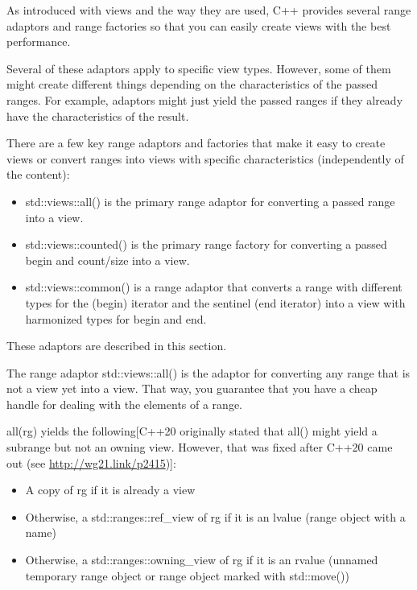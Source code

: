 
As introduced with views and the way they are used, C++ provides several range adaptors and range factories so that you can easily create views with the best performance.

Several of these adaptors apply to specific view types. However, some of them might create different things depending on the characteristics of the passed ranges. For example, adaptors might just yield the passed ranges if they already have the characteristics of the result.

There are a few key range adaptors and factories that make it easy to create views or convert ranges into views with specific characteristics (independently of the content):

\begin{itemize}
\item
std::views::all() is the primary range adaptor for converting a passed range into a view.

\item
std::views::counted() is the primary range factory for converting a passed begin and count/size into a view.

\item
std::views::common() is a range adaptor that converts a range with different types for the (begin) iterator and the sentinel (end iterator) into a view with harmonized types for begin and end.
\end{itemize}

These adaptors are described in this section.


The range adaptor std::views::all() is the adaptor for converting any range that is not a view yet into a view. That way, you guarantee that you have a cheap handle for dealing with the elements of a range.

all(rg) yields the following[C++20 originally stated that all() might yield a subrange but not an owning view. However, that was fixed after C++20 came out (see \url{http://wg21.link/p2415})]:

\begin{itemize}
\item
A copy of rg if it is already a view

\item
Otherwise, a std::ranges::ref\_view of rg if it is an lvalue (range object with a name)

\item
Otherwise, a std::ranges::owning\_view of rg if it is an rvalue (unnamed temporary range object or range object marked with std::move())
\end{itemize}

